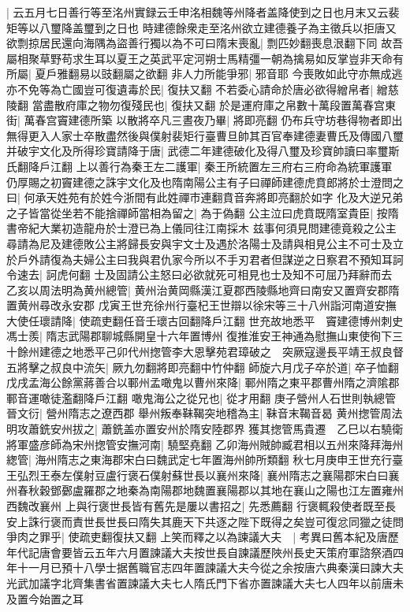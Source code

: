 |{
	云五月七日善行等至洺州實録云壬申洺相魏等州降者盖降使到之日也月末又云裴矩等以八璽降盖璽到之日也}
時建德餘衆走至洺州欲立建德養子為主徵兵以拒唐又欲剽掠居民還向海隅為盜善行獨以為不可曰隋末喪亂|{
	剽匹妙翻喪息泿翻下同}
故吾屬相聚草野苟求生耳以夏王之英武平定河朔士馬精彊一朝為擒易如反掌豈非天命有所屬|{
	夏戶雅翻易以豉翻屬之欲翻}
非人力所能爭邪|{
	邪音耶}
今喪敗如此守亦無成逃亦不免等為亡國豈可復遺毒於民|{
	復扶又翻}
不若委心請命於唐必欲得繒帛者|{
	繒慈陵翻}
當盡散府庫之物勿復殘民也|{
	復扶又翻}
於是運府庫之帛數十萬段置萬春宫東街|{
	萬春宫竇建德所築}
以散將卒凡三晝夜乃畢|{
	將即亮翻}
仍布兵守坊巷得物者即出無得更入人家士卒散盡然後與僕射裴矩行臺曹旦帥其百官奉建德妻曹氏及傳國八璽并破宇文化及所得珍寶請降于唐|{
	武德二年建德破化及得八璽及珍寶帥讀曰率璽斯氏翻降戶江翻}
上以善行為秦王左二護軍|{
	秦王所統置左三府右三府命為統軍護軍}
仍厚賜之初竇建德之誅宇文化及也隋南陽公主有子曰禪師建德虎賁郎將於士澄問之曰|{
	何承天姓苑有於姓今浙間有此姓禪市連翻賁音奔將即亮翻於如字}
化及大逆兄弟之子皆當從坐若不能捨禪師當相為留之|{
	為于偽翻}
公主泣曰虎賁既隋室貴臣|{
	按隋書帝紀大業初造龍舟於士澄已為上儀同往江南採木}
兹事何須見問建德竟殺之公主尋請為尼及建德敗公主將歸長安與宇文士及遇於洛陽士及請與相見公主不可士及立於戶外請復為夫婦公主曰我與君仇家今所以不手刃君者但謀逆之日察君不預知耳訶令速去|{
	訶虎何翻}
士及固請公主怒曰必欲就死可相見也士及知不可屈乃拜辭而去　乙亥以周法明為黄州總管|{
	黄州治黄岡縣漢江夏郡西陵縣地齊曰南安又置齊安郡隋置黄州尋改永安郡}
戊寅王世充徐州行臺杞王世辯以徐宋等三十八州詣河南道安撫大使任瓌請降|{
	使疏吏翻任音壬瓌古回翻降戶江翻}
世充故地悉平　竇建德博州刺史馮士羨|{
	隋志武陽郡聊城縣開皇十六年置博州}
復推淮安王神通為慰撫山東使徇下三十餘州建德之地悉平己卯代州揔管李大恩擊苑君璋破之　突厥寇邊長平靖王叔良督五將擊之叔良中流矢|{
	厥九勿翻將即亮翻中竹仲翻}
師旋六月戊子卒於道|{
	卒子恤翻}
戊戌孟海公餘黨蔣善合以鄆州孟噉鬼以曹州來降|{
	鄆州隋之東平郡曹州隋之濟隂郡鄆音運噉徒濫翻降戶江翻}
噉鬼海公之從兄也|{
	從才用翻}
庚子營州人石世則執總管晉文衍|{
	營州隋志之遼西郡}
舉州叛奉靺鞨突地稽為主|{
	靺音末鞨音曷}
黄州揔管周法明攻蕭銑安州拔之|{
	蕭銑盖亦置安州於隋安陸郡界}
獲其揔管馬貴遷　乙巳以右驍衛將軍盛彦師為宋州揔管安撫河南|{
	驍堅堯翻}
乙卯海州賊帥臧君相以五州來降拜海州緫管|{
	海州隋志之東海郡宋白曰魏武定七年置海州帥所類翻}
秋七月庚申王世充行臺王弘烈王泰左僕射豆盧行褒石僕射蘇世長以襄州來降|{
	襄州隋志之襄陽郡宋白曰襄州春秋穀鄧鄾盧羅郡之地秦為南陽郡地魏置襄陽郡以其地在襄山之陽也江左置雍州西魏改襄州}
上與行褒世長皆有舊先是屢以書招之|{
	先悉薦翻}
行褒輒殺使者既至長安上誅行褒而責世長世長曰隋失其鹿天下共逐之陛下既得之矣豈可復忿同獵之徒問爭肉之罪乎|{
	使疏吏翻復扶又翻}
上笑而釋之以為諫議大夫　|{
	考異曰舊本紀及唐歷年代記唐會要皆云五年六月置諫議大夫按世長自諫議歷陜州長史天策府軍諮祭酒四年十一月已預十八學士据舊職官志四年置諫議大夫今從之余按唐六典秦漢曰諫大夫光武加議字北齊集書省置諫議大夫七人隋氏門下省亦置諫議大夫七人四年以前唐未及置今始置之耳}
